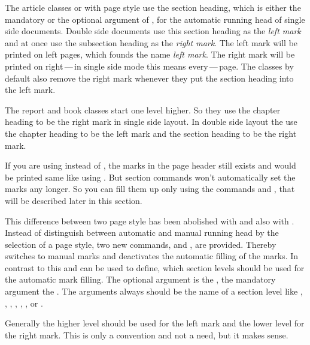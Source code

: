 The article classes
 or  with page style
 use the section heading, which
is either the mandatory or the optional argument of , for the
automatic running head of single side documents. Double side documents use
this section heading as the \emph{left mark} and at once use the subsection
heading as the \emph{right mark}. The left mark will be printed on left pages,
which founds the name \emph{left mark}. The right mark will be printed on
right\,---\,in single side mode this means every\,---\,page. The classes by
default also remove the right mark whenever they put the section heading into
the left mark.

The report and book classes  start one level
higher. So they use the chapter heading to be the right mark in single side
layout. In double side layout the use the chapter heading to be the left mark
and the section heading to be the right mark.

If you are using  instead of
, the marks in the page header
still exists and would be printed same like using . But
section commands won't automatically set the marks any longer. So you can fill
them up only using the commands  and , that
will be described later in this section.

This difference between two page style has been abolished with
 and also with . Instead of distinguish
between automatic and manual running head by the selection of a page style,
two new commands,  and , are
provided. Thereby  switches to manual marks and deactivates
the automatic filling of the marks. In contrast to this  and
 can be used to define, which section levels should be used
for the automatic mark filling. The optional argument is the , the mandatory argument the . The arguments always should be the name of a section level
like  , , , ,
, , or .

Generally the higher level should be used for the left mark and the lower
level for the right mark. This is only a convention and not a need, but it
makes sense.

